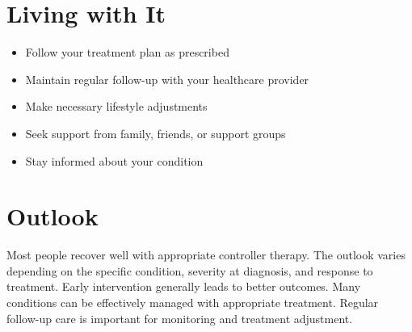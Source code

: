\section{Living with It}
\begin{itemize}[noitemsep]
  \item Follow your treatment plan as prescribed
  \item Maintain regular follow-up with your healthcare provider
  \item Make necessary lifestyle adjustments
  \item Seek support from family, friends, or support groups
  \item Stay informed about your condition
\end{itemize}
\section{Outlook}
Most people recover well with appropriate controller therapy. The outlook varies depending on the specific condition, severity at diagnosis, and response to treatment. Early intervention generally leads to better outcomes. Many conditions can be effectively managed with appropriate treatment. Regular follow-up care is important for monitoring and treatment adjustment.

